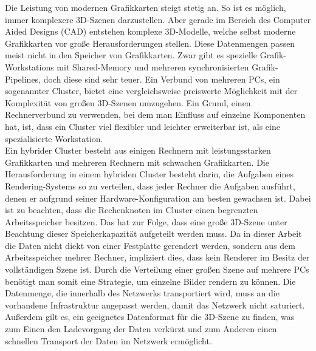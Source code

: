 Die Leistung von modernen Grafikkarten steigt stetig an. So ist es möglich, immer komplexere 3D-Szenen darzustellen. Aber gerade im Bereich des Computer Aided Designs (CAD) entstehen komplexe 3D-Modelle, welche selbst moderne Grafikkarten vor große Herausforderungen stellen. Diese Datenmengen passen meist nicht in den Speicher von Grafikkarten. Zwar gibt es spezielle Grafik-Workstations mit Shared-Memory und mehreren synchronisierten Grafik-Pipelines, doch diese sind sehr teuer. Ein Verbund von mehreren PCs, ein sogenannter Cluster, bietet eine vergleichsweise preiswerte Möglichkeit mit der Komplexität von großen 3D-Szenen umzugehen. Ein Grund, einen Rechnerverbund zu verwenden, bei dem man Einfluss auf einzelne Komponenten hat, ist, dass ein Cluster viel flexibler und leichter erweiterbar ist, als eine spezialisierte Workstation.\\
Ein hybrider Cluster besteht aus einigen Rechnern mit leistungsstarken Grafikkarten und mehreren Rechnern mit schwachen Grafikkarten. Die Herausforderung in einem hybriden Cluster besteht darin, die Aufgaben eines Rendering-Systems so zu verteilen, dass jeder Rechner die Aufgaben ausführt, denen er aufgrund seiner Hardware-Konfiguration am besten gewachsen ist. Dabei ist zu beachten, dass die Rechenknoten im Cluster einen begrenzten Arbeitsspeicher besitzen. Das hat zur Folge, dass eine große 3D-Szene unter Beachtung dieser Speicherkapazität aufgeteilt werden muss. Da in dieser Arbeit die Daten nicht diekt von einer Festplatte gerendert werden, sondern aus dem Arbeitsspeicher mehrer Rechner, impliziert dies, dass kein Renderer im Besitz der vollständigen Szene ist. Durch die Verteilung einer großen Szene auf mehrere PCs benötigt man somit eine Strategie, um einzelne Bilder rendern zu können. Die Datenmenge, die innerhalb des Netzwerks transportiert wird, muss an die vorhandene Infrastruktur angepasst werden, damit das Netzwerk nicht saturiert. Außerdem gilt es, ein geeignetes Datenformat für die 3D-Szene zu finden, was zum Einen den Ladevorgang der Daten verkürzt und zum Anderen einen schnellen Transport der Daten im Netzwerk ermöglicht.

